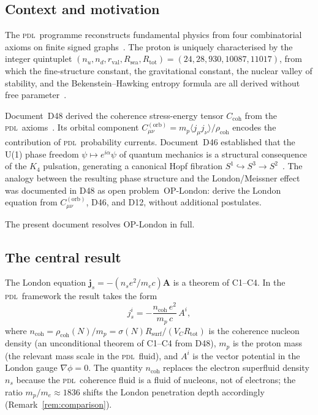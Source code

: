 \documentclass[12pt,a4paper]{article}
\newcommand{\Kfour}{K_4}
\newcommand{\PDL}{\textsc{pdl}}
\newcommand{\Ccoh}{C_{\mathrm{coh}}}
\newcommand{\Corb}{C^{(\mathrm{orb})}}
\newcommand{\rhocoh}{\rho_{\mathrm{coh}}}
\newcommand{\Rsurf}{R_{\mathrm{surf}}}
\newcommand{\Rtot}{R_{\mathrm{tot}}}
\newcommand{\sig}{\sigma}
\newcommand{\ncoh}{n_{\mathrm{coh}}}
\newcommand{\jsvec}{\mathbf{j}_s}
\newcommand{\Avec}{\mathbf{A}}
\begin{document}
\subsection{Context and motivation}

The \PDL\ programme reconstructs fundamental physics from four combinatorial axioms on finite signed graphs~\cite{PDL_D01_2026}. The proton is uniquely characterised by the integer quintuplet $(n_u, n_d, r_{\mathrm{val}}, R_{\mathrm{sea}}, \Rtot) = (24, 28, 930, 10087, 11017)$, from which the fine-structure constant, the gravitational constant, the nuclear valley of stability, and the Bekenstein--Hawking entropy formula are all derived without free parameter~\cite{PDL_D12_2026,PDL_D21_2026,PDL_D42_2026,PDL_D47_2026,PDL_D38_2026}.

Document~D48 derived the coherence stress-energy tensor $\Ccoh$ from the \PDL\ axioms~\cite{PDL_D48_2026}. Its orbital component $\Corb_{\mu\nu} = m_p\langle j_\mu j_\nu\rangle/\rhocoh$ encodes the contribution of \PDL\ probability currents. Document~D46 established that the U(1) phase freedom $\psi \mapsto e^{i\alpha}\psi$ of quantum mechanics is a structural consequence of the $\Kfour$ pulsation, generating a canonical Hopf fibration $S^1 \hookrightarrow S^3 \to S^2$~\cite{PDL_D46_2026}. The analogy between the resulting phase structure and the London/Meissner effect was documented in D48 as open problem~OP-London: derive the London equation from $\Corb_{\mu\nu}$, D46, and D12, without additional postulates.

The present document resolves OP-London in full.

\subsection{The central result}

The London equation $\jsvec = -(n_s e^2/m_e c)\Avec$ is a theorem of C1--C4. In the \PDL\ framework the result takes the form
\begin{equation}
j^i_s = -\frac{\ncoh\,e^2}{m_p\,c}\,A^i,
\label{eq:London_PDL}
\end{equation}
where $\ncoh = \rhocoh(N)/m_p = \sig(N)\Rsurf/(V_C \Rtot)$ is the coherence nucleon density (an unconditional theorem of C1--C4 from D48), $m_p$ is the proton mass (the relevant mass scale in the \PDL\ fluid), and $A^i$ is the vector potential in the London gauge $\nabla\phi = 0$. The quantity $\ncoh$ replaces the electron superfluid density $n_s$ because the \PDL\ coherence fluid is a fluid of nucleons, not of electrons; the ratio $m_p/m_e \approx 1836$ shifts the London penetration depth accordingly (Remark~\ref{rem:comparison}).
\end{document}
